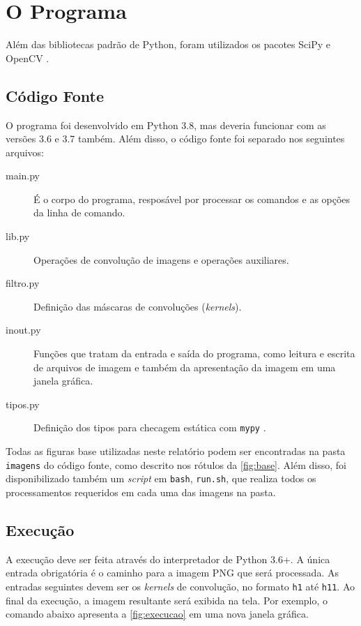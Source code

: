 \section{O Programa}

Além das bibliotecas padrão de Python, foram utilizados os pacotes SciPy \autocite{ref:scipy} e OpenCV \autocite{ref:opencv}.

\subsection{Código Fonte}

    O programa foi desenvolvido em Python 3.8, mas deveria funcionar com as versões 3.6 e 3.7 também. Além disso, o código fonte foi separado nos seguintes arquivos:

    \begin{description}
        \item[main.py] É o corpo do programa, resposável por processar os comandos e as opções da linha de comando.

        \item[lib.py] Operações de convolução de imagens e operações auxiliares.

        \item[filtro.py] Definição das máscaras de convoluções (\textit{kernels}).

        \item[inout.py] Funções que tratam da entrada e saída do programa, como leitura e escrita de arquivos de imagem e também da apresentação da imagem em uma janela gráfica.

        \item[tipos.py] Definição dos tipos para checagem estática com \texttt{mypy} \autocite{ref:mypy}.
    \end{description}

    Todas as figuras base utilizadas neste relatório podem ser encontradas na pasta \texttt{imagens} do código fonte, como descrito nos rótulos da \cref{fig:base}. Além disso, foi disponibilizado também um \textit{script} em \texttt{bash}, \texttt{run.sh}, que realiza todos os processamentos requeridos em cada uma das imagens na pasta.

\subsection{Execução} \label{sec:execucao}

    A execução deve ser feita através do interpretador de Python 3.6+. A única entrada obrigatória é o caminho para a imagem PNG que será processada. As entradas seguintes devem ser os \textit{kernels} de convolução, no formato \texttt{h1} até \texttt{h11}. Ao final da execução, a imagem resultante será exibida na tela. Por exemplo, o comando abaixo apresenta a \cref{fig:execucao} em uma nova janela gráfica.

